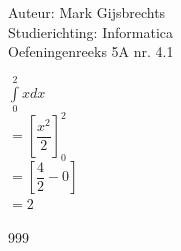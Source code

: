 \documentclass[a4paper]{article}
\newcommand{\dint}{\displaystyle\int}
\begin{document}
\noindent \large Auteur: Mark Gijsbrechts \\
\noindent \large Studierichting: Informatica\\
\noindent \large Oefeningenreeks 5A nr. 4.1\\

\medskip

\normalsize





$ \dint\limits_{0}^{2} x dx $ \\

$= \left[ \dfrac{x^2}{2} \right]_{0}^{2} $ \\

$= \left[ \dfrac{4}{2} - 0 \right] $ \\

$= 2 $ \\



\begin{thebibliography}{999}
\end{thebibliography}
\end{document}
